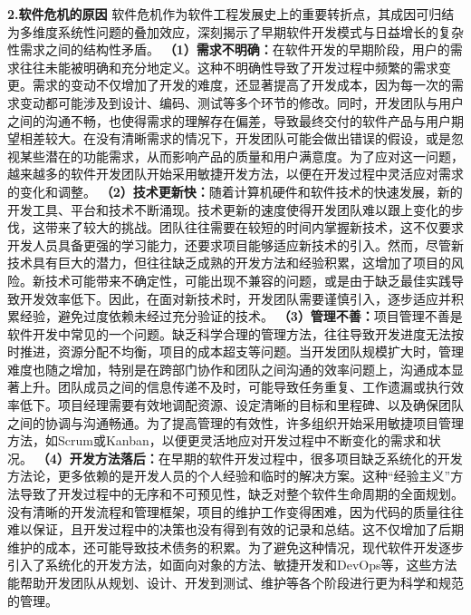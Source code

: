 \textbf{2.软件危机的原因} 软件危机作为软件工程发展史上的重要转折点，其成因可归结为多维度系统性问题的叠加效应，深刻揭示了早期软件开发模式与日益增长的复杂性需求之间的结构性矛盾。 \textbf{（1）需求不明确：}在软件开发的早期阶段，用户的需求往往未能被明确和充分地定义。这种不明确性导致了开发过程中频繁的需求变更。需求的变动不仅增加了开发的难度，还显著提高了开发成本，因为每一次的需求变动都可能涉及到设计、编码、测试等多个环节的修改。同时，开发团队与用户之间的沟通不畅，也使得需求的理解存在偏差，导致最终交付的软件产品与用户期望相差较大。在没有清晰需求的情况下，开发团队可能会做出错误的假设，或是忽视某些潜在的功能需求，从而影响产品的质量和用户满意度。为了应对这一问题，越来越多的软件开发团队开始采用敏捷开发方法，以便在开发过程中灵活应对需求的变化和调整。 \textbf{（2）技术更新快：}随着计算机硬件和软件技术的快速发展，新的开发工具、平台和技术不断涌现。技术更新的速度使得开发团队难以跟上变化的步伐，这带来了较大的挑战。团队往往需要在较短的时间内掌握新技术，这不仅要求开发人员具备更强的学习能力，还要求项目能够适应新技术的引入。然而，尽管新技术具有巨大的潜力，但往往缺乏成熟的开发方法和经验积累，这增加了项目的风险。新技术可能带来不确定性，可能出现不兼容的问题，或是由于缺乏最佳实践导致开发效率低下。因此，在面对新技术时，开发团队需要谨慎引入，逐步适应并积累经验，避免过度依赖未经过充分验证的技术。 \textbf{（3）管理不善：}项目管理不善是软件开发中常见的一个问题。缺乏科学合理的管理方法，往往导致开发进度无法按时推进，资源分配不均衡，项目的成本超支等问题。当开发团队规模扩大时，管理难度也随之增加，特别是在跨部门协作和团队之间沟通的效率问题上，沟通成本显著上升。团队成员之间的信息传递不及时，可能导致任务重复、工作遗漏或执行效率低下。项目经理需要有效地调配资源、设定清晰的目标和里程碑、以及确保团队之间的协调与沟通畅通。为了提高管理的有效性，许多组织开始采用敏捷项目管理方法，如Scrum或Kanban，以便更灵活地应对开发过程中不断变化的需求和状况。 \textbf{（4）开发方法落后：}在早期的软件开发过程中，很多项目缺乏系统化的开发方法论，更多依赖的是开发人员的个人经验和临时的解决方案。这种``经验主义''方法导致了开发过程中的无序和不可预见性，缺乏对整个软件生命周期的全面规划。没有清晰的开发流程和管理框架，项目的维护工作变得困难，因为代码的质量往往难以保证，且开发过程中的决策也没有得到有效的记录和总结。这不仅增加了后期维护的成本，还可能导致技术债务的积累。为了避免这种情况，现代软件开发逐步引入了系统化的开发方法，如面向对象的方法、敏捷开发和DevOps等，这些方法能帮助开发团队从规划、设计、开发到测试、维护等各个阶段进行更为科学和规范的管理。 